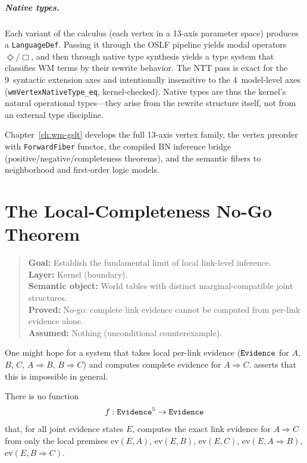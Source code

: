 \documentclass[11pt,openany]{report}
\begin{document}
\paragraph{Native types.}
Each variant of the calculus (each vertex in a 13-axis parameter space)
produces a \texttt{LanguageDef}.  Passing it through the OSLF pipeline
yields modal operators $\Diamond/\Box$, and then through native type
synthesis yields a type system that classifies WM terms by their rewrite
behavior.  The NTT pass is exact for the 9~syntactic extension axes and
intentionally insensitive to the 4~model-level axes
(\texttt{wmVertexNativeType\_eq}, kernel-checked).  Native types are thus
the kernel's natural operational types---they arise from the rewrite
structure itself, not from an external type discipline.

Chapter~\ref{ch:wm-gslt} develops the full 13-axis vertex family, the
vertex preorder with \texttt{ForwardFiber} functor, the compiled BN
inference bridge (positive/negative/completeness theorems), and the
semantic fibers to neighborhood and first-order logic models.


\chapter{The Local-Completeness No-Go Theorem}
\label{ch:no-go}

\begin{quote}\small
\textbf{Goal:} Establish the fundamental limit of local link-level inference.\\
\textbf{Layer:} Kernel (boundary).\\
\textbf{Semantic object:} World tables with distinct marginal-compatible joint structures.\\
\textbf{Proved:} No-go: complete link evidence cannot be computed from per-link evidence alone.\\
\textbf{Assumed:} Nothing (unconditional counterexample).
\end{quote}

One might hope for a system that takes local per-link evidence
($\mathtt{Evidence}$ for $A$, $B$, $C$, $A \Rightarrow B$, $B \Rightarrow C$)
and computes complete evidence for $A \Rightarrow C$.  \xiPLN{} asserts
that this is impossible in general.

\boundarystart
\begin{theorem}
\label{thm:no-go}
There is no function
\[
  f : \mathtt{Evidence}^5 \to \mathtt{Evidence}
\]
that, for all joint evidence states $E$, computes the exact link evidence
for $A \Rightarrow C$ from only the local premises
$\mathrm{ev}(E, A)$, $\mathrm{ev}(E, B)$, $\mathrm{ev}(E, C)$,
$\mathrm{ev}(E, A \Rightarrow B)$, $\mathrm{ev}(E, B \Rightarrow C)$.
\end{theorem}
\boundaryend
\end{document}
